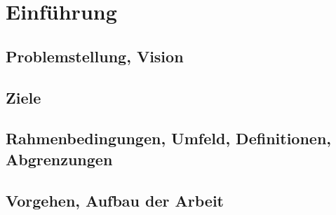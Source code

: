 \chapter{Einführung}
\label{tb-einfuehrung}

\section{Problemstellung, Vision}


\section{Ziele}


\section{Rahmenbedingungen, Umfeld, Definitionen, Abgrenzungen}


\section{Vorgehen, Aufbau der Arbeit}

